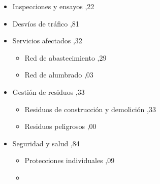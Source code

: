 \begin{itemize}
\begin{itemize}
\begin{itemize}
\begin{itemize}
13.772,90%
\item%
Fase 4%
,75%
\end{itemize}%
\item%
Impermeabilización y adecuación del drenaje%
,18%
\begin{itemize}%
\item%
Fase 1%
,69%
\item%
Fase 2%
,03%
\item%
Fase 3%
,76%
\item%
Fase 4%
,70%
\end{itemize}%
\item%
Pavimentos y acabados%
,52%
\begin{itemize}%
\item%
Fase 1%
,71%
\item%
Fase 2%
,09%
\item%
Fase 3%
,97%
\item%
Fase 4%
,82%
\item%
Cuñas de transición%
,93%
\end{itemize}%
\item%
Marcas viales%
,19%
\end{itemize}%
\item%
Inspecciones y ensayos%
,22%
\item%
Desvíos de tráfico%
,81%
\item%
Servicios afectados%
,32%
\begin{itemize}%
\item%
Red de abastecimiento%
,29%
\item%
Red de alumbrado%
,03%
\end{itemize}%
\item%
Gestión de residuos%
,33%
\begin{itemize}%
\item%
Residuos de construcción y demolición%
,33%
\item%
Residuos peligrosos%
,00%
\end{itemize}%
\item%
Seguridad y salud%
,84%
\begin{itemize}%
\item%
Protecciones individuales%
,09%
\item%

\end{itemize}
\end{itemize}
\end{itemize}
